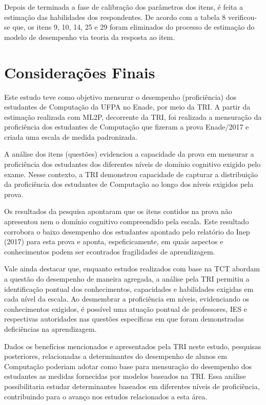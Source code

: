 \documentclass[12pt]{article}
\begin{document}
Depois de terminada a fase de calibração dos parâmetros dos itens, é feita a estimação das habilidades dos respondentes. De acordo com a tabela 8 verificou-se que, os itens 9, 10, 14, 25 e 29 foram eliminados do processo de estimação do modelo de desempenho via teoria da resposta ao item.





\section{Considerações Finais}

Este estudo teve como objetivo mensurar o desempenho (proficiência) dos estudantes de Computação da UFPA no Enade, por meio da TRI. A partir da estimação realizada com ML2P, decorrente da TRI, foi realizada a mensuração da proficiência dos estudantes de Computação que fizeram a prova Enade/2017 e criada uma escala de medida padronizada.

A análise dos itens (questões) evidenciou a capacidade da prova em mensurar a proficiência dos estudantes dos diferentes níveis de domínio cognitivo exigido pelo exame. Nesse contexto, a TRI demonstrou capacidade de capturar a distribuição da proficiência dos estudantes de Computação ao longo dos níveis exigidos pela prova.

Os resultados da pesquisa apontaram que os itens contidos na prova não apresentou nem o domínio cognitivo compreendido pela escala. Este resultado corrobora  o baixo desempenho dos estudantes apontado pelo relatório do Inep (2017) para esta prova e aponta, espeficicamente, em quais aspectos e conhecimentos podem ser econtrados fragilidades de aprendizagem.

Vale ainda destacar que, enquanto estudos realizados com base na TCT abordam a questão do desempenho de maneira agregada, a análise pela TRI permitiu a identificação pontual dos conhecimentos, capacidades e habilidades exigidas em cada nível da escala. Ao desmembrar a proficiência em níveis, evidenciando os conhecimentos exigidos, é possível uma atuação pontual de professores, IES e respectivas autoridades nas questões específicas em que foram demonstradas deficiências na aprendizagem. 

Dados os benefícios mencionados e apresentados pela TRI neste estudo, pesquisas posteriores, relacionadas a determinantes do desempenho de alunos em Computação poderiam adotar como base para mensuração do desempenho dos estudantes as medidas fornecidas por modelos baseados na TRI. Essa análise possibilitaria estudar determinantes baseados em diferentes níveis de proficiência, contribuindo para o avanço nos estudos relacionados a esta área.
\end{document}
